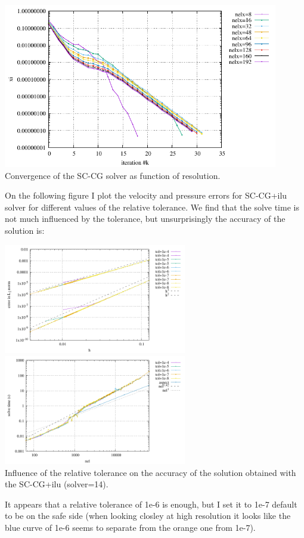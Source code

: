 \begin{center}
\includegraphics[width=12cm]{python_codes/fieldstone_147/RESULTS/convergence_schur_cpl.pdf}\\
{\captionfont Convergence of the SC-CG solver as function of resolution.}
\end{center}

On the following figure I plot the velocity and pressure errors for SC-CG+ilu solver 
for different values of the relative tolerance. We find that the solve time is not 
much influenced by the tolerance, but unsurprisingly the accuracy of the solution is: 
\begin{center}
\includegraphics[width=8cm]{python_codes/fieldstone_147/RESULTS/tol_study_solver14/errors.pdf}
\includegraphics[width=8cm]{python_codes/fieldstone_147/RESULTS/tol_study_solver14/solve.pdf}\\
{\captionfont Influence of the relative tolerance on the accuracy of the solution obtained 
with the SC-CG+ilu ({\python solver=14}).}
\end{center}
It appears that a relative tolerance of 1e-6 is enough, but I set it to 1e-7 default
to be on the safe side (when looking closley at high resolution it looks like the 
blue curve of 1e-6  seems to separate from the orange one from 1e-7).

